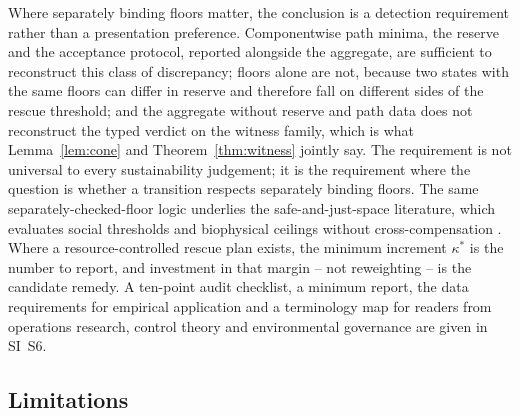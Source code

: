 Where separately binding floors matter, the conclusion is a detection requirement rather than a presentation preference. Componentwise path minima, the reserve and the acceptance protocol, reported alongside the aggregate, are sufficient to reconstruct this class of discrepancy; floors alone are not, because two states with the same floors can differ in reserve and therefore fall on different sides of the rescue threshold; and the aggregate without reserve and path data does not reconstruct the typed verdict on the witness family, which is what Lemma~\ref{lem:cone} and Theorem~\ref{thm:witness} jointly say. The requirement is not universal to every sustainability judgement; it is the requirement where the question is whether a transition respects separately binding floors. The same separately-checked-floor logic underlies the safe-and-just-space literature, which evaluates social thresholds and biophysical ceilings without cross-compensation \citep{Raworth2012,ONeill2018,Fanning2022}. Where a resource-controlled rescue plan exists, the minimum increment $\kappa^*$ is the number to report, and investment in that margin -- not reweighting -- is the candidate remedy. A ten-point audit checklist, a minimum report, the data requirements for empirical application and a terminology map for readers from operations research, control theory and environmental governance are given in SI~S6.

\subsection{Limitations}\label{sec:limitations}

